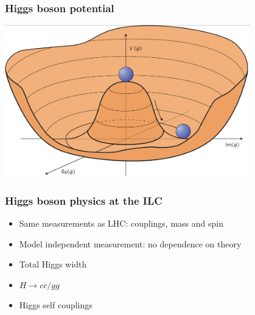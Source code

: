 \documentclass{beamer}
\begin{document}
  \appendix
  \setcounter{lastframe}{\insertframenumber}

  \begin{frame}[plain]
    \frametitle{Higgs boson potential}

    \begin{center}
      \includegraphics[width = 0.8\textwidth]{Pictures/higgsPotential.png}
    \end{center}
  \end{frame}

  \begin{frame}[plain]
    \frametitle{Higgs boson physics at the ILC}

    \begin{itemize}
      \item Same measurements as LHC: couplings, mass and spin
      \item Model independent measurement: no dependence on theory
      \item Total Higgs width
      \item $H \rightarrow c\overline{c}/gg$
      \item Higgs self couplings
    \end{itemize}
  \end{frame}
\end{document}
